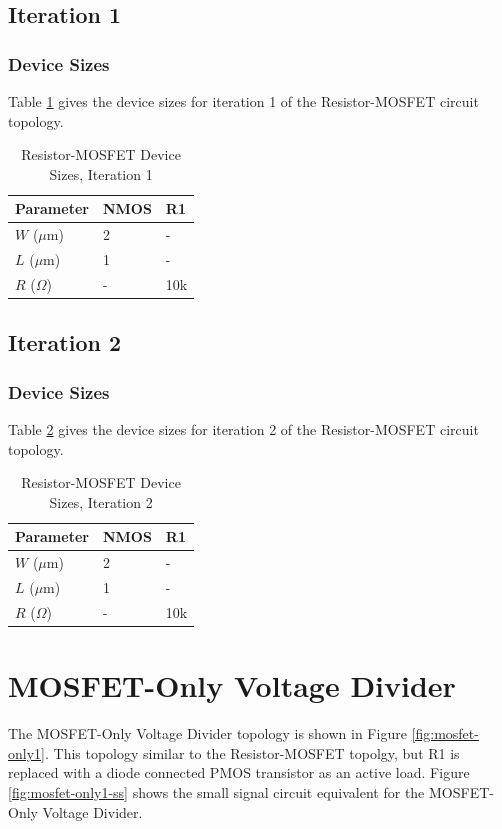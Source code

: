 \documentclass[conference]{IEEEtran}
\begin{document}
\subsection{Iteration 1}
\subsubsection{Device Sizes}
Table \ref{tab:rm-ds-1} gives the device sizes for iteration 1 of the Resistor-MOSFET circuit topology.
\begin{table}[!htbp]
  \caption[]{Resistor-MOSFET Device Sizes, Iteration 1}
  \label{tab:rm-ds-1}
  \centering
  \begin{tabular}{|l|l|l|}
    \hline
    Parameter			& NMOS	&R1 \\ \hline
    $W$ ($\mu$m)		&2		&-\\ 
    $L$ ($\mu$m)		& 1		&-\\
    $R$ ($\Omega$)		&-		&10k\\
    \hline
  \end{tabular}
\end{table}

\subsection{Iteration 2}
\subsubsection{Device Sizes}
Table \ref{tab:rm-ds-2} gives the device sizes for iteration 2 of the Resistor-MOSFET circuit topology. 
\begin{table}[!htbp]
  \caption[]{Resistor-MOSFET Device Sizes, Iteration 2}
  \label{tab:rm-ds-2}
  \centering
  \begin{tabular}{|l|l|l|}
    \hline
    Parameter			& NMOS	&R1 \\ \hline
    $W$ ($\mu$m)		&2		&-\\ 
    $L$ ($\mu$m)		& 1		&-\\
    $R$ ($\Omega$)		&-		&10k\\
    \hline
  \end{tabular}
\end{table}

\section{MOSFET-Only Voltage Divider}
The MOSFET-Only Voltage Divider topology is shown in Figure \ref{fig:mosfet-only1}.  This topology similar to the Resistor-MOSFET topolgy, but R1 is replaced with a diode connected PMOS transistor as an active load.  Figure \ref{fig:mosfet-only1-ss} shows the small signal circuit equivalent for the MOSFET-Only Voltage Divider.
\end{document}
